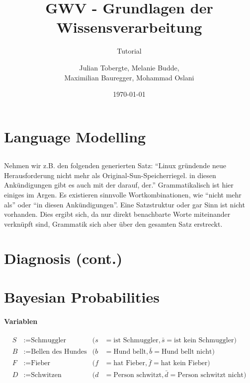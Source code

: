 \documentclass[DIV=9,numbers=noenddot]{scrartcl}
\title{GWV - Grundlagen der Wissensverarbeitung}
\subtitle{Tutorial \arabic{blatt}}
\author{Julian Tobergte, Melanie Budde,\\Maximilian Bauregger, Mohammad Oslani}
\date{\today}
\begin{document}
	\maketitle
	\section{Language Modelling}
		\setcounter{subsection}{1}
		\subsection{}
			Nehmen wir z.B. den folgenden generierten Satz: "`Linux gründende neue Herausforderung nicht mehr als Original-Sun-Speicherriegel. in diesen Ankündigungen gibt es auch mit der darauf, der."' Grammatikalisch ist hier einiges im Argen. Es existieren sinnvolle Wortkombinationen, wie "`nicht mehr als"' oder "`in diesen Ankündigungen"'. Eine Satzstruktur oder gar Sinn ist nicht vorhanden. Dies ergibt sich, da nur direkt benachbarte Worte miteinander verknüpft sind, Grammatik sich aber über den gesamten Satz erstreckt.
	\section{Diagnosis (cont.)}
	\section{Bayesian Probabilities}
		\paragraph{Variablen}
			\begin{align*}
				  S&:= \text{Schmuggler} &(s &= \text{ist Schmuggler}, \bar{s} = \text{ist kein Schmuggler})
				\\B&:= \text{Bellen des Hundes} &(b &= \text{Hund bellt}, \bar{b} = \text{Hund bellt nicht})
				\\F&:= \text{Fieber} &(f &= \text{hat Fieber}, \bar{f} = \text{hat kein Fieber})
				\\D&:= \text{Schwitzen} &(d &= \text{Person schwitzt}, \bar{d} = \text{Person schwitzt nicht})
			\end{align*}
\end{document}
